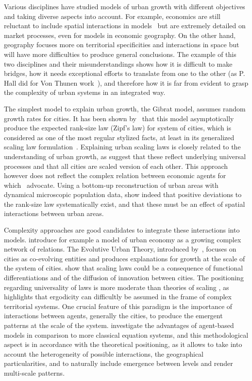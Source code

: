 \documentclass{article}
\begin{document}
Various disciplines have studied models of urban growth with different objectives and taking diverse aspects into account. For example, economics are still reluctant to include spatial interactions in models~\citep{krugman1998space} but are extremely detailed on market processes, even for models in economic geography. On the other hand, geography focuses more on territorial specificities and interactions in space but will have more difficulties to produce general conclusions. The example of this two disciplines and their misunderstandings \citep{marchionni2004geographical} shows how it is difficult to make bridges, how it needs exceptional efforts to translate from one to the other (as P. Hall did for Von Thunen work~\citep{taylor2016polymath}), and therefore how it is far from evident to grasp the complexity of urban systems in an integrated way.


The simplest model to explain urban growth, the Gibrat model, assumes random growth rates for cities. It has been shown by~\cite{gabaix1999zipf} that this model asymptotically produce the expected rank-size law (Zipf's law) for system of cities, which is considered as one of the most regular stylized facts, at least in its generalized scaling law formulation~\citep{nitsch2005zipf}. Explaining urban scaling laws is closely related to the understanding of urban growth, as \cite{bettencourt2008large} suggest that these reflect underlying universal processes and that all cities are scaled version of each other. This approach however does not reflect the complex relation between economic agents for which~\cite{storper2009rethinking} advocate. Using a bottom-up reconstruction of urban areas with dynamical microscopic population data, \cite{rozenfeld2008laws} show indeed that positive deviations to the rank-size law systematically exist, and that these must be an effect of spatial interactions between urban areas. 

Complexity approaches are good candidates to integrate these interactions into models. \cite{andersson2006complex} introduce for example a model of urban economy as a growing complex network of relations. The Evolutive Urban Theory, introduced by~\cite{pumain1997pour}, focuses on cities as co-evolving entities and produces explanations for growth at the scale of the system of cities. \cite{pumain2006evolutionary} show that scaling laws could be a consequence of functional differentiations and of the diffusion of innovation between cities. The positioning regarding universality of laws is more moderate than theories of scaling \citep{west2017scale}, as \cite{pumain2012urban} highlights that ergodicity can difficultly be assumed in the frame of complex territorial systems. One crucial feature of this paradigm is the importance of interactions between agents, generally the cities, to produce the emergent patterns at the scale of the system. \cite{pumain2013theoretical} investigate the advantages of agent-based models in comparison to more classical equation systems, and this methodological aspect is in accordance with the theoretical positioning, as it allows to take into account the heterogeneity of possible interactions, the geographical particularities, and to naturally include emergence between levels and render multi-scale patterns.
\end{document}
